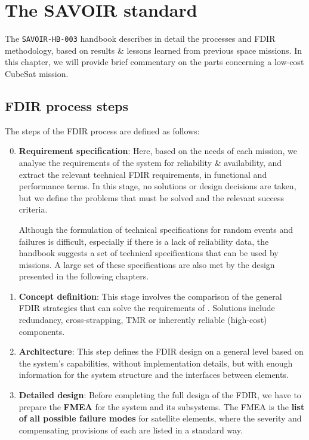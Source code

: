 \documentclass[a4paper,nobib]{tufte-book}
\begin{document}
\section{The SAVOIR standard}
The \texttt{SAVOIR-HB-003} handbook describes in detail the processes and \acs{FDIR} methodology, based on results \& lessons learned from previous space missions. In this chapter, we will provide brief commentary on the parts concerning a low-cost CubeSat mission.

\subsection{\acs{FDIR} process steps}
\bgroup
{}

The steps of the \acs{FDIR} process are defined as follows:
\begin{enumerate}
	\setcounter{enumi}{-1}
	\item \textbf{Requirement specification}: Here, based on the needs of each mission, we analyse the requirements of the system for reliability \& availability, and extract the relevant technical \acs{FDIR} requirements, in functional and performance terms. In this stage, no solutions or design decisions are taken, but we define the problems that must be solved and the relevant success criteria.
	\label{itm:fdir_reqs}

	
	Although the formulation of technical specifications for random events and failures is difficult, especially if there is a lack of reliability data, the handbook suggests a set of technical specifications \autocite[42]{SAVOIR-HB-003} that can be used by missions. A large set of these specifications are also met by the design presented in the following chapters.
	
	\item \textbf{Concept definition}: This stage involves the comparison of the general \acs{FDIR} strategies that can solve the requirements of . Solutions include redundancy, cross-strapping, \acl{TMR} or inherently reliable (high-cost) components.
	
	
	\label{itm:fdir_concept}

	\item \textbf{Architecture}: This step defines the \acs{FDIR} design on a general level based on the system's capabilities, without implementation details, but with enough information for the system structure and the interfaces between elements.
	
	\item \textbf{Detailed design}: Before completing the full design of the \acs{FDIR}, we have to prepare the \textbf{\acf{FMEA}} \autocite{carlson_effective_fmeas_2012} for the system and its subsystems. The \acs{FMEA} is the \textbf{list of all possible failure modes} for satellite elements, where the severity and compensating provisions of each are listed in a standard way.
	

\end{enumerate}
\end{document}
